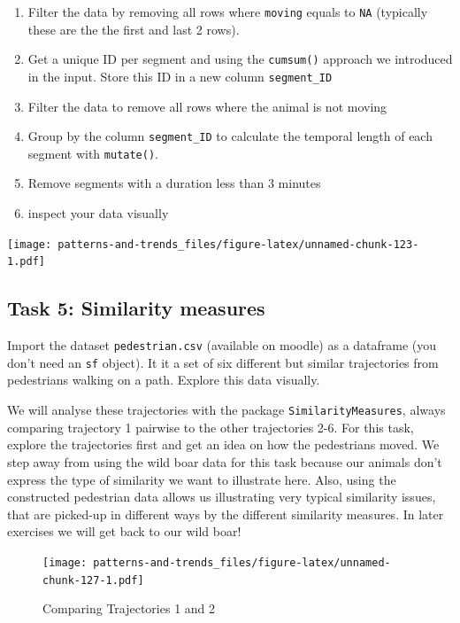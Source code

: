 \documentclass[]{book}
\providecommand{\tightlist}{%
  \setlength{\itemsep}{0pt}\setlength{\parskip}{0pt}}
\begin{document}
\begin{enumerate}
\def\labelenumi{\arabic{enumi}.}
\tightlist
\item
  Filter the data by removing all rows where \texttt{moving} equals to \texttt{NA} (typically these are the the first and last 2 rows).
\item
  Get a unique ID per segment and using the \texttt{cumsum()} approach we introduced in the input. Store this ID in a new column \texttt{segment\_ID}
\item
  Filter the data to remove all rows where the animal is not moving
\item
  Group by the column \texttt{segment\_ID} to calculate the temporal length of each segment with \texttt{mutate()}.
\item
  Remove segments with a duration less than 3 minutes
\item
  inspect your data visually
\end{enumerate}

\texttt{[image: patterns-and-trends\_files/figure-latex/unnamed-chunk-123-1.pdf]}

\hypertarget{task-5-similarity-measures}{%
\subsection{Task 5: Similarity measures}\label{task-5-similarity-measures}}

Import the dataset \texttt{pedestrian.csv} (available on moodle) as a dataframe (you don't need an \texttt{sf} object). It it a set of six different but similar trajectories from pedestrians walking on a path. Explore this data visually.

We will analyse these trajectories with the package \texttt{SimilarityMeasures}, always comparing trajectory 1 pairwise to the other trajectories 2-6. For this task, explore the trajectories first and get an idea on how the pedestrians moved. We step away from using the wild boar data for this task because our animals don't express the type of similarity we want to illustrate here. Also, using the constructed pedestrian data allows us illustrating very typical similarity issues, that are picked-up in different ways by the different similarity measures. In later exercises we will get back to our wild boar!

\begin{figure}
\centering
\texttt{[image: patterns-and-trends\_files/figure-latex/unnamed-chunk-127-1.pdf]}
\caption{\label{fig:unnamed-chunk-127}Comparing Trajectories 1 and 2}
\end{figure}
\end{document}
